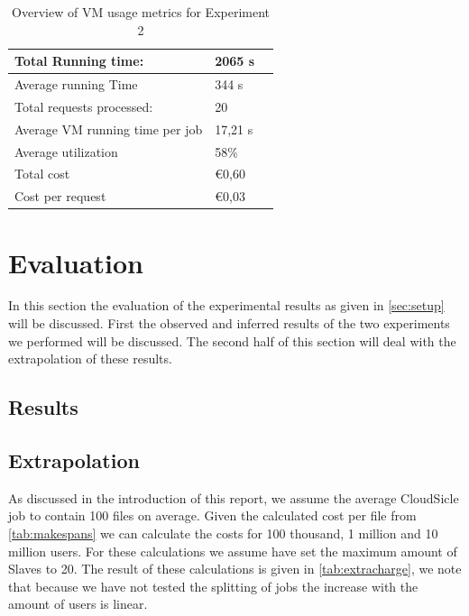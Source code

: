 \documentclass[twocolumn,twoside]{IEEEtran}
\begin{document}
\begin{table}
\caption{Overview of VM usage metrics for Experiment 2}
\begin{tabularx}{92mm}{|l||X|X|}
\hline 
Total Running time:	& 2065 s \\
\hline 
Average running Time & 344 s \\
\hline 
Total requests processed: & 20 \\
\hline 
Average VM running time per job & 17,21 s \\
\hline 
Average utilization & 58\% \\
\hline 
Total cost & \euro{0,60} \\
\hline 
Cost per request & \euro{0,03} \\
\hline 
\end{tabularx}
\end{table}

\section{Evaluation}
\label{sec:eval}
In this section the evaluation of the experimental results as given in \autoref{sec:setup} will be discussed.
First the observed and inferred results of the two experiments we performed will be discussed.
The second half of this section will deal with the extrapolation of these results.

\subsection{Results}

\subsection{Extrapolation}
As discussed in the introduction of this report, we assume the average CloudSicle job to contain 100 files on average.
Given the calculated cost per file from \autoref{tab:makespans} we can calculate the costs for 100 thousand, 1 million and 10 million users.
For these calculations we assume have set the maximum amount of Slaves to 20.
The result of these calculations is given in \autoref{tab:extracharge}, we note that because we have
not tested the splitting of jobs the increase with the amount of users is linear.
\end{document}
